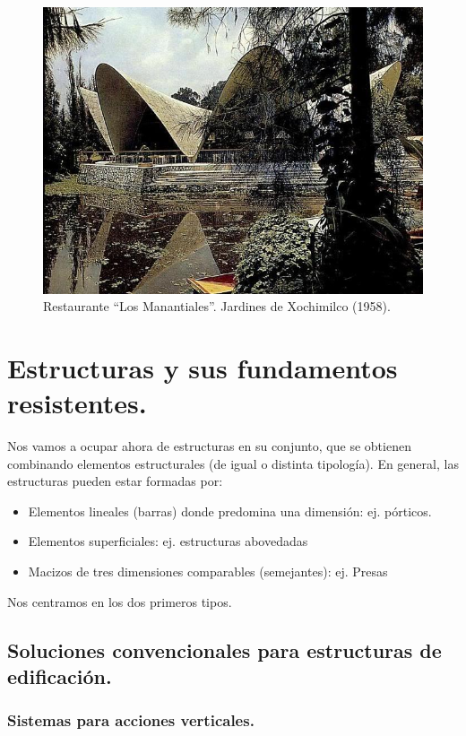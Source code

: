 \begin{figure}[h]
    \centering
    \includegraphics[width=1\linewidth]{Imagenes/Jardines de Xochimilco.png}
    \caption{Restaurante ``Los Manantiales''. Jardines de Xochimilco (1958).}
\end{figure}

\section{Estructuras y sus fundamentos resistentes.}
Nos vamos a ocupar ahora de estructuras en su conjunto, que se obtienen combinando elementos estructurales (de igual o distinta tipología). En general, las estructuras pueden estar formadas por:
\begin{itemize}
    \item Elementos lineales (barras) donde predomina una dimensión: ej. pórticos.
    \item Elementos superficiales: ej. estructuras abovedadas
    \item Macizos de tres dimensiones comparables (semejantes): ej. Presas
\end{itemize}
Nos centramos en los dos primeros tipos.

\subsection{Soluciones convencionales para estructuras de edificación.}
\subsubsection{Sistemas para acciones verticales.}

